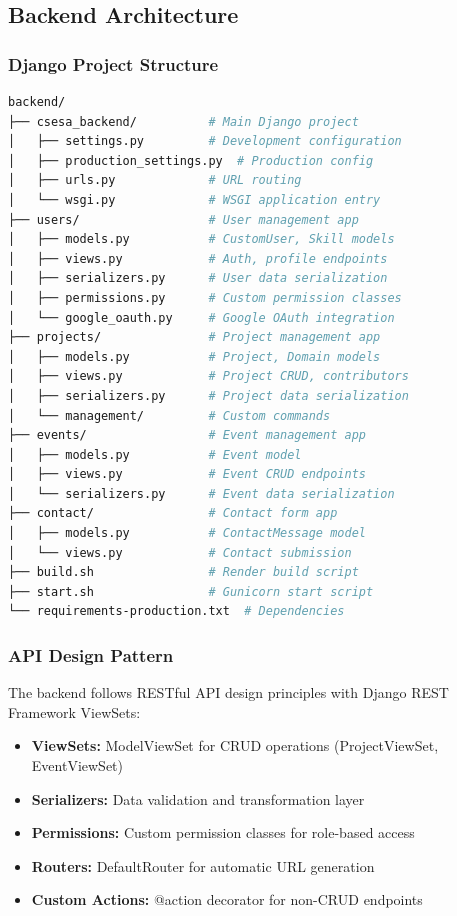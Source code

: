 \documentclass[11pt,a4paper]{article}
\begin{document}
\subsection{Backend Architecture}

\subsubsection{Django Project Structure}
\begin{lstlisting}[language=bash]
backend/
├── csesa_backend/          # Main Django project
│   ├── settings.py         # Development configuration
│   ├── production_settings.py  # Production config
│   ├── urls.py             # URL routing
│   └── wsgi.py             # WSGI application entry
├── users/                  # User management app
│   ├── models.py           # CustomUser, Skill models
│   ├── views.py            # Auth, profile endpoints
│   ├── serializers.py      # User data serialization
│   ├── permissions.py      # Custom permission classes
│   └── google_oauth.py     # Google OAuth integration
├── projects/               # Project management app
│   ├── models.py           # Project, Domain models
│   ├── views.py            # Project CRUD, contributors
│   ├── serializers.py      # Project data serialization
│   └── management/         # Custom commands
├── events/                 # Event management app
│   ├── models.py           # Event model
│   ├── views.py            # Event CRUD endpoints
│   └── serializers.py      # Event data serialization
├── contact/                # Contact form app
│   ├── models.py           # ContactMessage model
│   └── views.py            # Contact submission
├── build.sh                # Render build script
├── start.sh                # Gunicorn start script
└── requirements-production.txt  # Dependencies
\end{lstlisting}

\subsubsection{API Design Pattern}
The backend follows RESTful API design principles with Django REST Framework ViewSets:

\begin{itemize}[leftmargin=*]
    \item \textbf{ViewSets:} ModelViewSet for CRUD operations (ProjectViewSet, EventViewSet)
    \item \textbf{Serializers:} Data validation and transformation layer
    \item \textbf{Permissions:} Custom permission classes for role-based access
    \item \textbf{Routers:} DefaultRouter for automatic URL generation
    \item \textbf{Custom Actions:} @action decorator for non-CRUD endpoints
\end{itemize}
\end{document}
